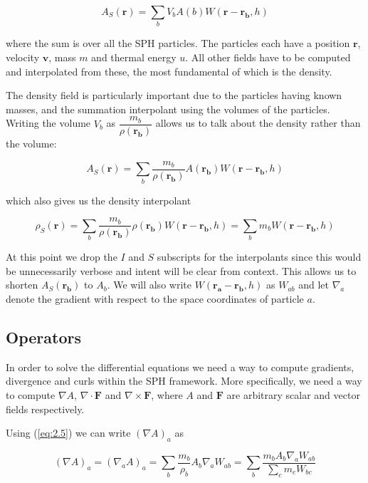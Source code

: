 \documentclass[../main.tex]{subfiles}
\begin{document}
\begin{equation}
    A_S(\bm{r}) = \sum_{b} V_b A(b) W(\bm{r} - \bm{r_b}, h)
\end{equation}

where the sum is over all the SPH particles. The particles each have a position $\bm{r}$, velocity $\bm{v}$, mass $m$ and thermal energy $u$. All other fields have to be computed and interpolated from these, the most fundamental of which is the density.

The density field is particularly important due to the particles having known masses, and the summation interpolant using the volumes of the particles. Writing the volume $V_b$ as $\dfrac{m_b}{\rho(\bm{r_b})}$ allows us to talk about the density rather than the volume:

\begin{equation} \label{eq:2.5}
    A_S(\bm{r}) = \sum_{b} \frac{m_b}{\rho(\bm{r_b})} A(\bm{r_b}) W(\bm{r} - \bm{r_b}, h)
\end{equation}

which also gives us the density interpolant

\begin{equation}
    \rho_S(\bm{r}) = \sum_{b} \frac{m_b}{\rho(\bm{r_b})} \rho(\bm{r_b}) W(\bm{r} - \bm{r_b}, h) = \sum_{b} m_b W(\bm{r} - \bm{r_b}, h)
\end{equation}

At this point we drop the $I$ and $S$ subscripts for the interpolants since this would be unnecessarily verbose and intent will be clear from context. This allows us to shorten $A_S(\bm{r_b})$ to $A_b$. We will also write $W(\bm{r_a} - \bm{r_b}, h)$ as $W_{ab}$ and let $\nabla_a$ denote the gradient with respect to the space coordinates of particle $a$.

\subsection{Operators}
In order to solve the differential equations we need a way to compute gradients, divergence and curls within the SPH framework. More specifically, we need a way to compute $\nabla A$, $\nabla\cdot\bm{F}$ and $\nabla\times\bm{F}$, where $A$ and $\bm{F}$ are arbitrary scalar and vector fields respectively.

Using (\ref{eq:2.5}) we can write $(\nabla A)_a$ as

\begin{equation}
    (\nabla A)_a = (\nabla_a A)_a =
    \sum_b \frac{m_b}{\rho_b} A_b \nabla_a W_{ab} =
    \sum_b \frac{m_b A_b \nabla_a W_{ab}}{\sum_c m_c W_{bc}}
\end{equation}
\end{document}
